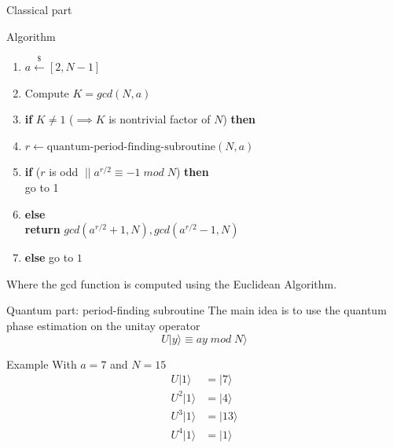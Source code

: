 \documentclass{beamer}
\begin{document}
    \begin{frame}{Classical part}
        \begin{alertblock}{Algorithm}
            \begin{enumerate}
                \item $a \overset{\$}{\leftarrow} [2, N-1]$
                \item Compute $K = gcd(N,a)$
                \item \textbf{if} $K \neq 1 $ ($\implies K$ is nontrivial factor of $N$) \textbf{then}
                \item \hspace{0.5cm} $r \leftarrow \text{quantum-period-finding-subroutine}(N,a)$
                \item \hspace{0.5cm} \textbf{if} ($r$ is odd $\; || \; a^{r/2} \equiv -1 \; mod \; N$)   \textbf{then} \\ \hspace{1cm} go to 1
                \item \hspace{0.5cm} \textbf{else} \\ \hspace{1cm} \textbf{return} $gcd(a^{r/2} + 1, N), gcd(a^{r/2} - 1, N)$
                \item \textbf{else} go to $1$
            \end{enumerate}
        \end{alertblock}

        Where the gcd function is computed using the Euclidean Algorithm.
    \end{frame}

    \begin{frame}{Quantum part: period-finding subroutine}
        The main idea is to use the quantum phase estimation on the unitay
        operator $$ U|y \rangle \equiv ay \; mod \; N \rangle$$

        \begin{exampleblock}{Example}
            With $a = 7$ and $N = 15$
            \begin{align*}
                U|1 \rangle &= |7 \rangle \\
                U^2|1 \rangle &= |4 \rangle \\
                U^3|1 \rangle &= |13 \rangle \\
                U^4|1 \rangle &= |1 \rangle
            \end{align*}
        \end{exampleblock}
    \end{frame}
\end{document}

